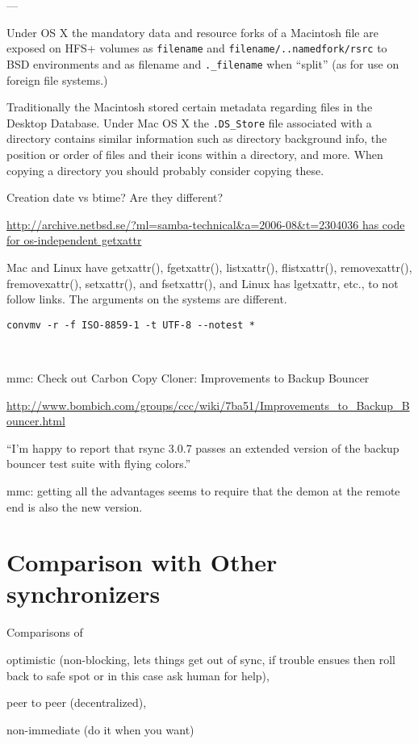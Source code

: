 \documentclass{book}
\begin{document}
---

Under OS X the mandatory data and resource forks of a Macintosh file are exposed on HFS+ volumes as \verb+filename+ and \verb+filename/..namedfork/rsrc+ to BSD environments and as filename and \verb+._filename+ when ``split'' (as for use on foreign file systems.)

Traditionally the Macintosh stored certain metadata regarding files in the Desktop Database. Under Mac OS X the \verb+.DS_Store+ file associated with a directory contains similar information such as directory background info, the position or order of files and their icons within a directory, and more. When copying a directory you should probably consider copying these.

Creation date vs btime?  Are they different?

\url{http://archive.netbsd.se/?ml=samba-technical&a=2006-08&t=2304036  has code for os-independent getxattr}

Mac and Linux have getxattr(), fgetxattr(), listxattr(), flistxattr(), removexattr(), fremovexattr(),  setxattr(), and fsetxattr(), and Linux has lgetxattr, etc., to not follow links.  The arguments on the systems are different.

\verb+convmv -r -f ISO-8859-1 -t UTF-8 --notest *+

~

mmc: Check out Carbon Copy Cloner: Improvements to Backup Bouncer

\url{http://www.bombich.com/groups/ccc/wiki/7ba51/Improvements_to_Backup_Bouncer.html}

``I'm happy to report that rsync 3.0.7 passes an extended version of the backup bouncer test suite with flying colors.''

mmc: getting all the advantages seems to require that the demon at the remote end is also the new version.





\section{Comparison with Other synchronizers}

Comparisons of

		optimistic (non-blocking, lets things get out of sync, if trouble ensues then roll back to safe spot or in this case ask human for help),

		peer to peer (decentralized),

		non-immediate (do it when you want)
\end{document}

